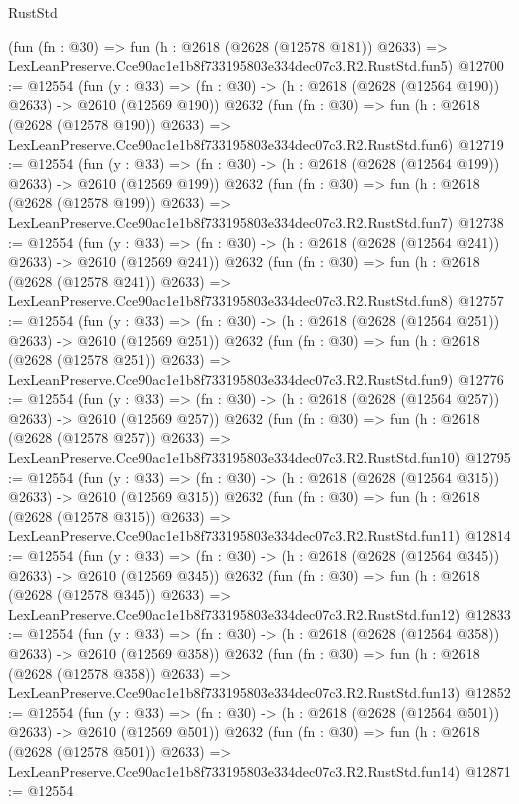 \begin{lexlean}{RustStd}
\begin{coremodule}
    (fun (fn : @30) =>
    fun (h : @2618 (@2628 (@12578 @181)) @2633) =>
    LexLeanPreserve.Cce90ac1e1b8f733195803e334dec07c3.R2.RustStd.fun5)
@12700 := @12554
    (fun (y : @33) => (fn : @30) -> (h : @2618 (@2628 (@12564 @190)) @2633) -> @2610 (@12569 @190))
    @2632
    (fun (fn : @30) =>
    fun (h : @2618 (@2628 (@12578 @190)) @2633) =>
    LexLeanPreserve.Cce90ac1e1b8f733195803e334dec07c3.R2.RustStd.fun6)
@12719 := @12554
    (fun (y : @33) => (fn : @30) -> (h : @2618 (@2628 (@12564 @199)) @2633) -> @2610 (@12569 @199))
    @2632
    (fun (fn : @30) =>
    fun (h : @2618 (@2628 (@12578 @199)) @2633) =>
    LexLeanPreserve.Cce90ac1e1b8f733195803e334dec07c3.R2.RustStd.fun7)
@12738 := @12554
    (fun (y : @33) => (fn : @30) -> (h : @2618 (@2628 (@12564 @241)) @2633) -> @2610 (@12569 @241))
    @2632
    (fun (fn : @30) =>
    fun (h : @2618 (@2628 (@12578 @241)) @2633) =>
    LexLeanPreserve.Cce90ac1e1b8f733195803e334dec07c3.R2.RustStd.fun8)
@12757 := @12554
    (fun (y : @33) => (fn : @30) -> (h : @2618 (@2628 (@12564 @251)) @2633) -> @2610 (@12569 @251))
    @2632
    (fun (fn : @30) =>
    fun (h : @2618 (@2628 (@12578 @251)) @2633) =>
    LexLeanPreserve.Cce90ac1e1b8f733195803e334dec07c3.R2.RustStd.fun9)
@12776 := @12554
    (fun (y : @33) => (fn : @30) -> (h : @2618 (@2628 (@12564 @257)) @2633) -> @2610 (@12569 @257))
    @2632
    (fun (fn : @30) =>
    fun (h : @2618 (@2628 (@12578 @257)) @2633) =>
    LexLeanPreserve.Cce90ac1e1b8f733195803e334dec07c3.R2.RustStd.fun10)
@12795 := @12554
    (fun (y : @33) => (fn : @30) -> (h : @2618 (@2628 (@12564 @315)) @2633) -> @2610 (@12569 @315))
    @2632
    (fun (fn : @30) =>
    fun (h : @2618 (@2628 (@12578 @315)) @2633) =>
    LexLeanPreserve.Cce90ac1e1b8f733195803e334dec07c3.R2.RustStd.fun11)
@12814 := @12554
    (fun (y : @33) => (fn : @30) -> (h : @2618 (@2628 (@12564 @345)) @2633) -> @2610 (@12569 @345))
    @2632
    (fun (fn : @30) =>
    fun (h : @2618 (@2628 (@12578 @345)) @2633) =>
    LexLeanPreserve.Cce90ac1e1b8f733195803e334dec07c3.R2.RustStd.fun12)
@12833 := @12554
    (fun (y : @33) => (fn : @30) -> (h : @2618 (@2628 (@12564 @358)) @2633) -> @2610 (@12569 @358))
    @2632
    (fun (fn : @30) =>
    fun (h : @2618 (@2628 (@12578 @358)) @2633) =>
    LexLeanPreserve.Cce90ac1e1b8f733195803e334dec07c3.R2.RustStd.fun13)
@12852 := @12554
    (fun (y : @33) => (fn : @30) -> (h : @2618 (@2628 (@12564 @501)) @2633) -> @2610 (@12569 @501))
    @2632
    (fun (fn : @30) =>
    fun (h : @2618 (@2628 (@12578 @501)) @2633) =>
    LexLeanPreserve.Cce90ac1e1b8f733195803e334dec07c3.R2.RustStd.fun14)
@12871 := @12554

\end{coremodule}
\end{lexlean}
